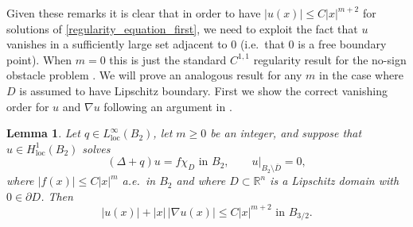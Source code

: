 \documentclass[11pt,a4paper]{amsart}
\newtheorem{Lemma}[Theorem]{Lemma}
\theoremstyle{definition}
\numberwithin{equation}{section}
\newcommand{\mR}{\mathbb{R}}                    %
\newcommand{\abs}[1]{\lvert #1 \rvert}          %
\newcommand{\ol}[1]{\overline{#1}}
\newcommand{\p}{\partial}
\begin{document}
Given these remarks it is clear that in order to have $\abs{u(x)} \leq C \abs{x}^{m+2}$ for solutions of \eqref{regularity_equation_first}, we need to exploit the fact that $u$ vanishes in a sufficiently large set adjacent to $0$ (i.e.\ that $0$ is a free boundary point). When $m = 0$ this is just the standard $C^{1,1}$ regularity result for the no-sign obstacle problem \cite{AnderssonLindgrenShahgholian}. We will prove an analogous result for any $m$ in the case where $D$ is assumed to have Lipschitz boundary. First we show the correct vanishing order for $u$ and $\nabla u$ following an argument in \cite{KarpShahgholian}.



\begin{Lemma} \label{lemma_c11_first}
Let $q \in L^{\infty}_{\mathrm{loc}}(B_2)$, let $m \geq 0$ be an integer, and suppose that $u \in H^1_{\mathrm{loc}}(B_2)$ solves 
\[
(\Delta + q)u = f \chi_D \text{ in $B_2$}, \qquad u|_{B_2 \setminus \ol{D}} = 0,
\]
where $\abs{f(x)} \leq C \abs{x}^m$ a.e.\ in $B_2$ and where $D \subset \mR^n$ is a Lipschitz domain with $0 \in \p D$. Then 
\[
\abs{u(x)} + \abs{x} \, \abs{\nabla u(x)} \leq C \abs{x}^{m+2} \text{ in $B_{3/2}$}.
\]
\end{Lemma}
\end{document}
